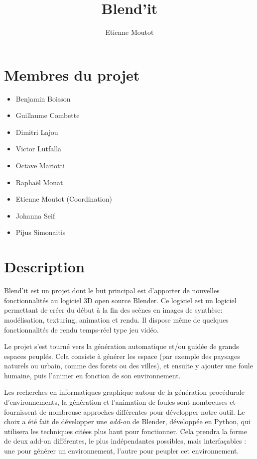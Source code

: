\documentclass[a4paper,12pt]{article}
\title{Blend'it}
\author{Etienne Moutot}
\begin{document}
\maketitle

\section{Membres du projet}
  \begin{itemize}
    \item Benjamin Boisson
    \item Guillaume Combette
    \item Dimitri Lajou
    \item Victor Lutfalla
    \item Octave Mariotti
    \item Raphaël Monat
    \item Etienne Moutot (Coordination)
    \item Johanna Seif
    \item Pijus Simonaitis
  \end{itemize}

\section{Description}
Blend'it est un projet dont le but principal est d'apporter de nouvelles fonctionnalités au logiciel 3D open source Blender\cite{Blender}. Ce logiciel est un logiciel permettant de créer du début à la fin des scènes en images de synthèse: modélisation, texturing, animation et rendu. Il dispose même de quelques fonctionnalités de rendu temps-réel type jeu vidéo.

Le projet s'est tourné vers la génération automatique et/ou guidée de grands espaces peuplés. Cela consiste à générer les espace (par exemple des paysages naturels ou urbain, comme des forets ou des villes), et ensuite y ajouter une foule humaine, puis l'animer en fonction de son environnement.

Les recherches en informatiques graphique autour de la génération procédurale d'environnements, la génération et  l'animation de foules sont nombreuses et fournissent de nombreuse approches différentes pour développer notre outil. Le choix a été fait de développer une \textit{add-on} de Blender, développée en Python, qui utilisera les techniques citées plus haut pour fonctionner. Cela prendra la forme de deux add-on différentes, le plus indépendantes possibles, mais interfaçables : une pour générer un environnement, l'autre pour peupler cet environnement.
\end{document}
